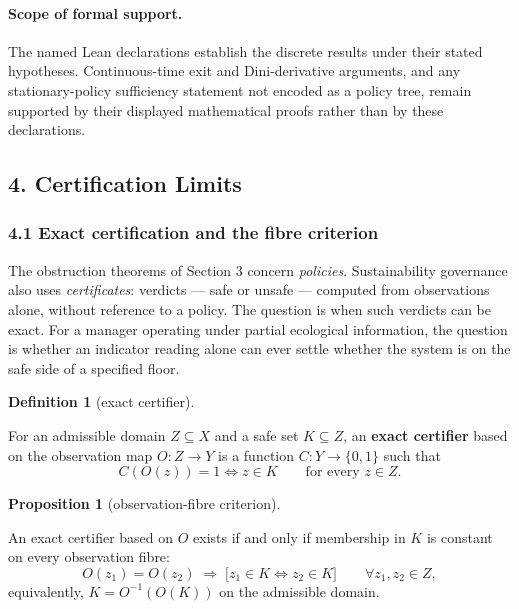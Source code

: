 \documentclass[10pt,twocolumn]{article}
\theoremstyle{definition}
\newtheorem{proposition}{Proposition}
\newtheorem{definition}{Definition}
\begin{document}
\paragraph{Scope of formal support.} The named Lean declarations establish the
discrete results under their stated hypotheses. Continuous-time exit and Dini-derivative
arguments, and any stationary-policy sufficiency statement not encoded as a policy tree,
remain supported by their displayed mathematical proofs rather than by these declarations.

\subsection{4. Certification Limits}\label{calc-certification-limits}

\subsubsection{4.1 Exact certification and the fibre
criterion}\label{calc-exact-certification-and-the-fibre-criterion}

The obstruction theorems of Section 3 concern \emph{policies}.
Sustainability governance also uses \emph{certificates}: verdicts
--- safe or unsafe --- computed from observations alone, without
reference to a policy. The question is when such verdicts can be exact.
For a manager operating under partial ecological information, the question is whether an indicator reading alone can ever settle whether the system is on the safe side of a specified floor.

\begin{definition}[exact certifier]\label{calc-def:certifier}

For an admissible domain
\(Z \subseteq X\) and a safe set \(K \subseteq Z\), an \textbf{exact
certifier} based on the observation map \(O : Z \to Y\) is a function
\(C : Y \to \{0,1\}\) such that
\[C(O(z)) = 1 \iff z \in K \qquad \text{for every } z \in Z.\]

\end{definition}

\begin{proposition}[observation-fibre criterion]\label{calc-prop:fibre}

An exact certifier
based on \(O\) exists if and only if membership in \(K\) is constant on
every observation fibre:
\[O(z_1) = O(z_2) \;\Longrightarrow\; \big[ z_1 \in K \iff z_2 \in K \big] \qquad \forall z_1, z_2 \in Z, \tag{5}\]
equivalently, \(K = O^{-1}(O(K))\) on the admissible domain.

\end{proposition}
\end{document}
